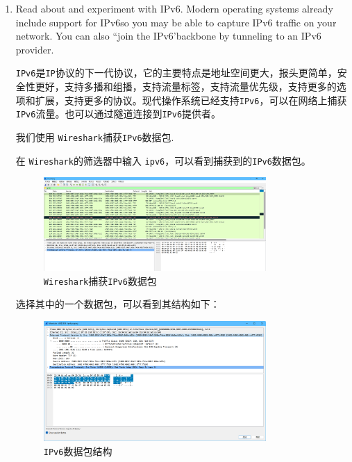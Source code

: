 \documentclass{article}
\begin{document}
\begin{enumerate}[noitemsep]
  \item Read about and experiment with IPv6. Modern operating systems already include support for IPv6so you may be able to capture IPv6 traffic on your network. You can also “join the IPv6'backbone by tunneling to an IPv6 provider.

        \texttt{IPv6}是\texttt{IP}协议的下一代协议，它的主要特点是地址空间更大，报头更简单，安全性更好，支持多播和组播，支持流量标签，支持流量优先级，支持更多的选项和扩展，支持更多的协议。现代操作系统已经支持\texttt{IPv6}，可以在网络上捕获\texttt{IPv6}流量。也可以通过隧道连接到\texttt{IPv6}提供者。

        我们使用 \texttt{Wireshark}捕获\texttt{IPv6}数据包.

        在 \texttt{Wireshark}的筛选器中输入 \texttt{ipv6}，可以看到捕获到的\texttt{IPv6}数据包。

        \begin{figure}[H]
          \centering
          \includegraphics[width=0.8\textwidth]{img/23.png}
          \caption{\texttt{Wireshark}捕获\texttt{IPv6}数据包}
          \label{fig:23}
        \end{figure}

        选择其中的一个数据包，可以看到其结构如下：

        \begin{figure}[H]
          \centering
          \includegraphics[width=0.8\textwidth]{img/24.png}
          \caption{\texttt{IPv6}数据包结构}
          \label{fig:24}
        \end{figure}


\end{enumerate}
\end{document}

